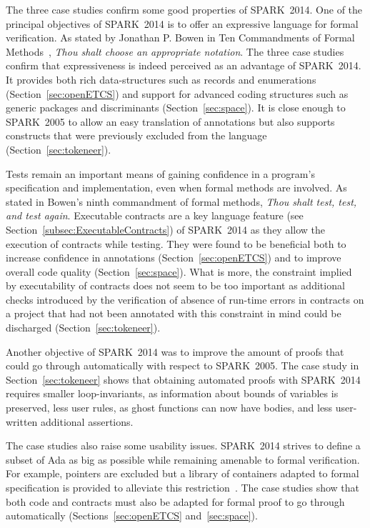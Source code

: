\documentclass[10pt,a4paper,twocolumn]{article}
\newcommand{\oldspark}{SPARK~2005\xspace}
\newcommand{\newspark}{SPARK~2014\xspace}
\begin{document}
The three case studies confirm some good properties of \newspark.  One
of the principal objectives of \newspark is to offer an expressive
language for formal verification. As stated by Jonathan P. Bowen in
Ten Commandments of Formal Methods~\cite{bowen1995ten}, \emph{Thou
  shalt choose an appropriate notation}. The three case studies
confirm that expressiveness is indeed perceived as an advantage of
\newspark. It provides both rich data-structures such as records and
enumerations (Section~\ref{sec:openETCS}) and support for advanced
coding structures such as generic packages and discriminants
(Section~\ref{sec:space}). It is close enough to \oldspark to allow an
easy translation of annotations but also supports constructs that were
previously excluded from the language (Section~\ref{sec:tokeneer}).

Tests remain an important means of gaining confidence in a program's
specification and implementation, even when formal methods are
involved. As stated in Bowen's ninth commandment of formal methods,
\emph{Thou shalt test, test, and test again}. Executable contracts are
a key language feature (see Section~\ref{subsec:ExecutableContracts})
of \newspark as they allow the execution of contracts while
testing. They were found to be beneficial both to increase confidence
in annotations (Section~\ref{sec:openETCS}) and to improve overall
code quality (Section~\ref{sec:space}). What is more, the constraint
implied by executability of contracts does not seem to be too
important as additional checks introduced by the verification of
absence of run-time errors in contracts on a project that had not been
annotated with this constraint in mind could be discharged
(Section~\ref{sec:tokeneer}).

Another objective of \newspark was to improve the amount of proofs
that could go through automatically with respect to \oldspark. The
case study in Section~\ref{sec:tokeneer} shows that obtaining
automated proofs with \newspark requires smaller loop-invariants, as
information about bounds of variables is preserved, less user rules,
as ghost functions can now have bodies, and less user-written
additional assertions.

The case studies also raise some usability issues. \newspark strives
to define a subset of Ada as big as possible while remaining amenable
to formal verification. For example, pointers are excluded but a
library of containers adapted to formal specification is provided to
alleviate this restriction~\cite{dross2011correct}. The case studies
show that both code and contracts must also be adapted for formal
proof to go through automatically (Sections~\ref{sec:openETCS}
and~\ref{sec:space}).
\end{document}
